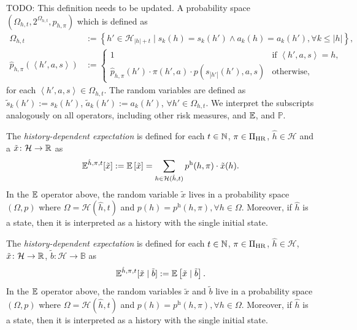 TODO: This definition needs to be updated. 
A probability space $(\Omega_{h,t}, 2^{\Omega_{h,t} }, \hat{p}_{h,\pi})$ which is defined as
\begin{align}
\label{eq:omega-def}
  \Omega_{h,t} &:= \left\{ h' \in \mathcal{H}_{|h| + t} \mid s_k(h) = s_k(h') \wedge a_k(h) = a_k(h'), \forall k \le |h| \right\}, \\
  \label{eq:phat-def}
\hat{p}_{h,\pi}\left(\left< h', a, s \right>\right)
&:= \begin{cases}
1 &\text{if } \left< h', a, s \right> = h, \\
\hat{p}_{h,\pi}(h') \cdot  \pi(h', a) \cdot p(s_{|h'|}(h'), a, s)
&\text{otherwise},
\end{cases}
\end{align}
for each $\left< h', a, s \right> \in \Omega_{h,t}$. The random variables are defined as $\tilde{s}_k(h') := s_k(h')$, $\tilde{a}_k(h') := a_k(h')$, $\forall h'\in \Omega_{h,t}$. We interpret the subscripts analogously on all operators, including other risk measures, and $\mathbb{E}$, and $\mathbb{P}$.



\begin{definition}\label{def:expect-h}
The \emph{history-dependent expectation} is defined for each $t\in \mathbb{N}$, $\pi\in \Pi_{\mathrm{HR}}$, $\hat{h}\in \mathcal{H}$ and a $\tilde{x}\colon \mathcal{H} \to \mathbb{R}$ as
\begin{equation*}
\mathbb{E}^{\hat{h}, \pi, t} [\tilde{x}]
:= \mathbb{E} \left[ \tilde{x} \right] 
= \sum_{h \in \mathcal{H}(\hat{h}, t)} p^{\mathrm{h}}(h, \pi) \cdot \tilde{x}(h).
\end{equation*}
In the $\mathbb{E}$ operator above, the random variable $\tilde{x}$ lives in a probability space $(\Omega, p)$ where $\Omega = \mathcal{H}(\hat{h}, t)$ and $p(h) = p^{\mathrm{h}}(h, \pi), \forall h\in \Omega$.
Moreover, if $\hat{h}$ is a state, then it is interpreted as a history with the single initial state.
\end{definition}


\begin{definition}\label{def:expect-h-cnd}
The \emph{history-dependent expectation} is defined for each $t\in \mathbb{N}$, $\pi\in \Pi_{\mathrm{HR}}$, $\hat{h}\in \mathcal{H}$, $\tilde{x}\colon \mathcal{H} \to \mathbb{R}$, $\tilde{b}\colon \mathcal{H} \to \mathcal{\mathbb{B}}$ as
\begin{equation*}
\mathbb{E}^{\hat{h}, \pi, t} [\tilde{x} \mid \tilde{b} ]
:= \mathbb{E} \left[ \tilde{x} \mid  \tilde{b} \right].
\end{equation*}
In the $\mathbb{E}$ operator above, the random variables $\tilde{x}$ and $\tilde{b}$ live in a probability space $(\Omega, p)$ where $\Omega = \mathcal{H}(\hat{h}, t)$ and $p(h) = p^{\mathrm{h}}(h, \pi), \forall h\in \Omega$.
Moreover, if $\hat{h}$ is a state, then it is interpreted as a history with the single initial state.
\end{definition}

